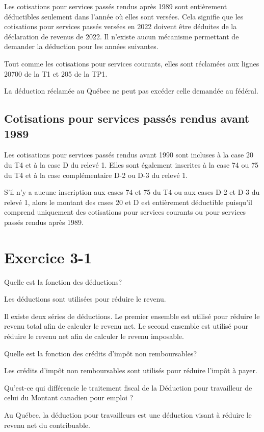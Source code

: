 Les cotisations pour services passés rendus après 1989 sont entièrement déductibles seulement dans l'année où elles sont versées. Cela signifie que les cotisations pour services passés versées en 2022 doivent être déduites de la déclaration de revenus de 2022. Il n'existe aucun mécanisme permettant de demander la déduction pour les années suivantes.

Tout comme les cotisations pour services courants, elles sont réclamées aux lignes 20700 de la T1 et 205 de la TP1.

La déduction réclamée au Québec ne peut pas excéder celle demandée au fédéral.


\subsection{Cotisations pour services passés rendus avant 1989}
Les cotisations pour services passés rendus avant 1990 sont incluses à la case 20 du T4 et à la case D du relevé 1. Elles sont également inscrites à la case 74 ou 75 du T4 et à la case complémentaire D-2 ou D-3 du relevé 1.

S'il n'y a aucune inscription aux cases 74 et 75 du T4 ou aux cases D-2 et D-3 du relevé 1, alors le montant des cases 20 et D est entièrement déductible puisqu'il comprend uniquement des cotisations pour services courants ou pour services passés rendus après 1989.



\section{Exercice 3-1}
\setcounter{question}{0}
\begin{question}
	Quelle est la fonction des déductions?
\end{question}
Les déductions sont utilisées pour réduire le revenu.

Il existe deux séries de déductions. Le premier ensemble est utilisé pour réduire le revenu total afin de calculer le revenu net. Le second ensemble est utilisé pour réduire le revenu net afin de calculer le revenu imposable.

\begin{question}
	Quelle est la fonction des crédits d'impôt non remboursables?
\end{question}
Les crédits d'impôt non remboursables sont utilisés pour réduire l'impôt à payer.

\begin{question}
	Qu'est-ce qui différencie le traitement fiscal de la \og Déduction pour travailleur \fg{} de celui du \og Montant canadien pour emploi \fg{}? 
\end{question}
Au Québec, la déduction pour travailleurs est une déduction visant à réduire le revenu net du contribuable.


